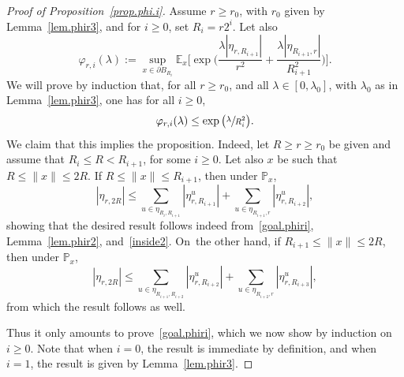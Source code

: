 \documentclass[11pt]{article}
\numberwithin{equation}{section}
\theoremstyle{plain}
\theoremstyle{definition}
\newcommand{\1}{{\text{\Large $\mathfrak 1$}}}
\let\phi\varphi
\begin{document}
\begin{proof}[Proof of Proposition~\ref{prop.phi.i}]
Assume $r\ge r_0$, with $r_0$ given by Lemma~\ref{lem.phir3}, and for $i\ge 0$, set $R_i = r2^i$. Let also
\[
\phi_{r,i}(\lambda) := \sup_{x\in \partial B_{R_i}}
\mathbb E_x\Big[\exp\Big(\frac{\lambda|\eta_{r,R_{i+1}}|}{r^2}
+ \frac{\lambda|\eta_{R_{i+1},r}|}{R_{i+1}^2}\Big)\Big].
\]
We will prove by induction that,
for all $r\ge r_0$, and all $\lambda\in[0,\lambda_0]$, with $\lambda_0$ as in Lemma~\ref{lem.phir3}, one has for all $i\ge 0$,
\begin{equation}\label{goal.phiri}
\varphi_{r,i}(\lambda)\le \exp\big(\sfrac{\lambda}{R_i^2}\big).
\end{equation}
We claim that this implies the proposition.
Indeed, let $R\ge r\ge r_0$ be given and assume that $R_i\le R< R_{i+1}$, for some $i\ge 0$. Let also $x$ be such that $R\le \|x\|\le 2R$.
If $R\le \|x\|\le R_{i+1}$, then under $\mathbb P_x$,
\[
|\eta_{r,2R}|\le \sum_{u\in \eta_{R_i,R_{i+1}}} |\eta^u_{r,R_{i+1}}|
+ \sum_{u\in \eta_{R_{i+1},r}} |\eta^u_{r,R_{i+2}}|,
\]
showing that the desired result follows indeed from~\eqref{goal.phiri},
Lemma~\ref{lem.phir2}, and~\eqref{inside2}.
On~the other hand, if $R_{i+1}\le \|x\|\le 2R$, then under $\mathbb P_x$,
\[
|\eta_{r,2R}|\le \sum_{u\in \eta_{R_{i+1},R_{i+2}} }
|\eta^u_{r,R_{i+2}}| + \sum_{u\in \eta_{R_{i+2},r} }
|\eta^u_{r,R_{i+3}}|,
\]
from which the result follows as well.

Thus it only amounts to prove~\eqref{goal.phiri},
which we now show by induction on $i\ge 0$.
Note that when $i=0$, the result is immediate by definition, and when $i=1$, the result is given by Lemma~\ref{lem.phir3}.


\end{proof}
\end{document}

